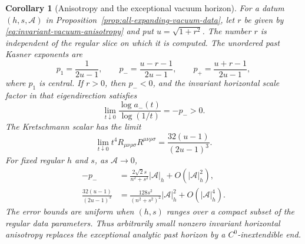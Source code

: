 \documentclass[10pt,a4paper]{article}
\numberwithin{equation}{section}
\newtheorem{corollary}[theorem]{Corollary}
\theoremstyle{definition}
\theoremstyle{remark}
\begin{document}
\begin{corollary}[Anisotropy and the exceptional vacuum horizon]
\label{cor:quantitative-vacuum-horizon}
For a datum $(h,s,\mathcal A)$ in
Proposition~\ref{prop:all-expanding-vacuum-data}, let $r$ be given by
\eqref{eq:invariant-vacuum-anisotropy} and put $u=\sqrt{1+r^2}$.
The number $r$ is independent of the regular slice on which it is
computed.  The unordered past Kasner exponents are
\begin{equation}
 p_1=\frac1{2u-1},\qquad
 p_-=\frac{u-r-1}{2u-1},\qquad
 p_+=\frac{u+r-1}{2u-1},
 \label{eq:regular-data-past-exponents}
\end{equation}
where $p_1$ is central.  If $r>0$, then $p_-<0$, and the invariant
horizontal scale factor in that eigendirection satisfies
\[
 \lim_{t\downarrow0}
 \frac{\log a_-(t)}{\log(1/t)}=-p_->0.
\]
The Kretschmann scalar has the limit
\begin{equation}
 \lim_{t\downarrow0}
 t^4 R_{\mu\nu\rho\sigma}R^{\mu\nu\rho\sigma}
 =\frac{32(u-1)}{(2u-1)^3}.
 \label{eq:vacuum-anisotropy-curvature}
\end{equation}
For fixed regular $h$ and $s$, as $\mathcal A\to0$,
\begin{align}
 -p_-&=\frac{2\sqrt2s}{n^2+s^2}|\mathcal A|_h
          +O(|\mathcal A|_h^2),\label{eq:vacuum-horizon-linear-rate}\\
 \frac{32(u-1)}{(2u-1)^3}
 &=\frac{128s^2}{(n^2+s^2)^2}|\mathcal A|_h^2
          +O(|\mathcal A|_h^4).
 \label{eq:vacuum-horizon-quadratic-curvature}
\end{align}
The error bounds are uniform when $(h,s)$ ranges over a compact subset
of the regular data parameters.
Thus arbitrarily small nonzero invariant horizontal anisotropy replaces
the exceptional analytic past horizon by a $C^0$-inextendible end.
\end{corollary}
\end{document}

